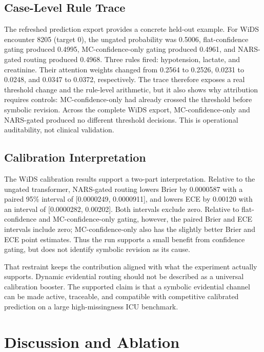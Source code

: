 \documentclass[final]{nesy2026}
\begin{document}
\subsection{Case-Level Rule Trace}

The refreshed prediction export provides a concrete held-out example. For WiDS encounter 8205 (target 0), the ungated probability was 0.5006, flat-confidence gating produced 0.4995, MC-confidence-only gating produced 0.4961, and NARS-gated routing produced 0.4968. Three rules fired: hypotension, lactate, and creatinine. Their attention weights changed from 0.2564 to 0.2526, 0.0231 to 0.0248, and 0.0347 to 0.0372, respectively. The trace therefore exposes a real threshold change and the rule-level arithmetic, but it also shows why attribution requires controls: MC-confidence-only had already crossed the threshold before symbolic revision. Across the complete WiDS export, MC-confidence-only and NARS-gated produced no different threshold decisions. This is operational auditability, not clinical validation.

\subsection{Calibration Interpretation}

The WiDS calibration results support a two-part interpretation. Relative to the ungated transformer, NARS-gated routing lowers Brier by 0.0000587 with a paired 95\% interval of [0.0000249, 0.0000911], and lowers ECE by 0.00120 with an interval of [0.0000282, 0.00202]. Both intervals exclude zero. Relative to flat-confidence and MC-confidence-only gating, however, the paired Brier and ECE intervals include zero; MC-confidence-only also has the slightly better Brier and ECE point estimates. Thus the run supports a small benefit from confidence gating, but does not identify symbolic revision as its cause.

That restraint keeps the contribution aligned with what the experiment actually supports. Dynamic evidential routing should not be described as a universal calibration booster. The supported claim is that a symbolic evidential channel can be made active, traceable, and compatible with competitive calibrated prediction on a large high-missingness ICU benchmark.

\section{Discussion and Ablation}
\label{sec:analysis}
\end{document}
